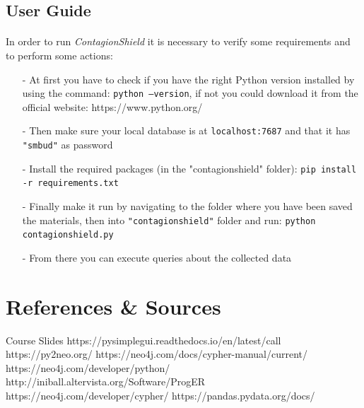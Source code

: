 \documentclass[a4paper,12pt]{article}
\begin{document}
\subsection{User Guide}
\paragraph{}
In order to run \emph{ContagionShield} it is necessary to verify some requirements and to perform some actions:
\begin{itemize}[noitemsep]
   \item[-] At first you have to check if you have the right Python version installed by using the command: \texttt{python --version}, if not you could download it from the official website: https://www.python.org/ 
   \item[-] Then make sure your local database is at \texttt{localhost:7687} and that it has \texttt{"smbud"} as password
   \item[-] Install the required packages (in the "contagionshield" folder): \texttt{pip install -r requirements.txt}
   \item[-] Finally make it run by navigating to the folder where you have been saved the materials, then into \texttt{"contagionshield"} folder and run: \texttt{python contagionshield.py}
   \item[-] From there you can execute queries about the collected data
\end{itemize}
\newpage
\section{References \& Sources}
  \begin{thebibliography}{9}
    \bibitem{} Course Slides
    \bibitem{} https://pysimplegui.readthedocs.io/en/latest/call%
    \bibitem{} https://py2neo.org/
    \bibitem{} https://neo4j.com/docs/cypher-manual/current/
    \bibitem{} https://neo4j.com/developer/python/
    \bibitem{} http://iniball.altervista.org/Software/ProgER
    \bibitem{} https://neo4j.com/developer/cypher/
    \bibitem{} https://pandas.pydata.org/docs/
  \end{thebibliography}
\end{document}
